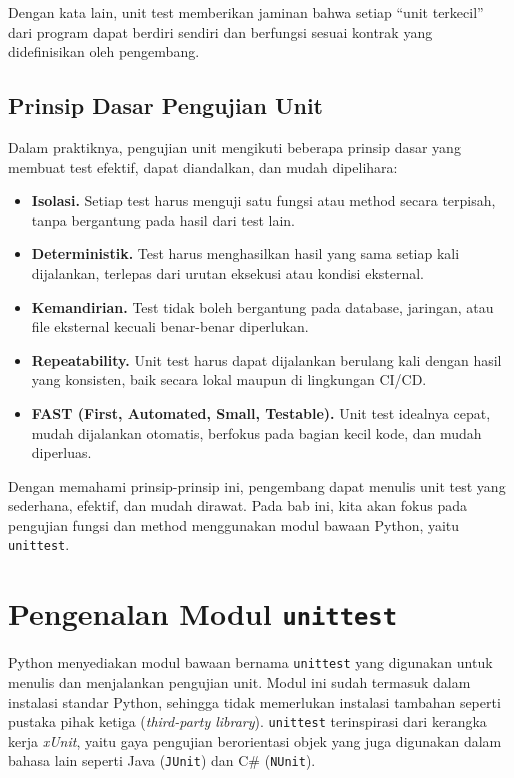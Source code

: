 Dengan kata lain, unit test memberikan jaminan bahwa setiap “unit terkecil” dari program dapat berdiri sendiri dan berfungsi sesuai kontrak yang didefinisikan oleh pengembang.

\subsection{Prinsip Dasar Pengujian Unit}

Dalam praktiknya, pengujian unit mengikuti beberapa prinsip dasar yang membuat test efektif, dapat diandalkan, dan mudah dipelihara:

\begin{itemize}
    \item \textbf{Isolasi.}  
    Setiap test harus menguji satu fungsi atau method secara terpisah, tanpa bergantung pada hasil dari test lain.
    
    \item \textbf{Deterministik.}  
    Test harus menghasilkan hasil yang sama setiap kali dijalankan, terlepas dari urutan eksekusi atau kondisi eksternal.
    
    \item \textbf{Kemandirian.}  
    Test tidak boleh bergantung pada database, jaringan, atau file eksternal kecuali benar-benar diperlukan.
    
    \item \textbf{Repeatability.}  
    Unit test harus dapat dijalankan berulang kali dengan hasil yang konsisten, baik secara lokal maupun di lingkungan CI/CD.
    
    \item \textbf{FAST (First, Automated, Small, Testable).}  
    Unit test idealnya cepat, mudah dijalankan otomatis, berfokus pada bagian kecil kode, dan mudah diperluas.
\end{itemize}

Dengan memahami prinsip-prinsip ini, pengembang dapat menulis unit test yang sederhana, efektif, dan mudah dirawat.  
Pada bab ini, kita akan fokus pada pengujian fungsi dan method menggunakan modul bawaan Python, yaitu \texttt{unittest}.


\section{Pengenalan Modul \texttt{unittest}}

Python menyediakan modul bawaan bernama \texttt{unittest} yang digunakan untuk menulis dan menjalankan pengujian unit. Modul ini sudah termasuk dalam instalasi standar Python, sehingga tidak memerlukan instalasi tambahan seperti pustaka pihak ketiga (\textit{third-party library}).  
\texttt{unittest} terinspirasi dari kerangka kerja \textit{xUnit}, yaitu gaya pengujian berorientasi objek yang juga digunakan dalam bahasa lain seperti Java (\texttt{JUnit}) dan C\# (\texttt{NUnit}).

